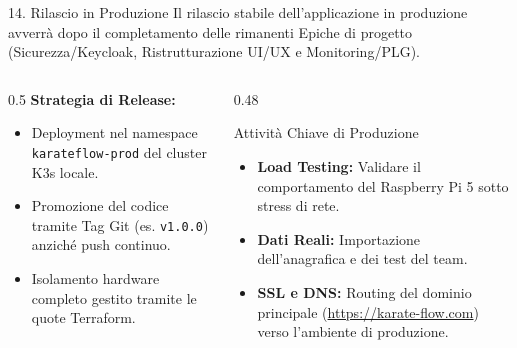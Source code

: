 \documentclass[aspectratio=169, 10pt]{beamer}
\begin{document}
\begin{frame}{14. Rilascio in Produzione}
  Il rilascio stabile dell'applicazione in produzione avverrà dopo il completamento delle rimanenti Epiche di progetto (Sicurezza/Keycloak, Ristrutturazione UI/UX e Monitoring/PLG).  
  \vspace{0.4cm}
  \begin{columns}
    \begin{column}{0.5\textwidth}
      \textbf{Strategia di Release:}
      \begin{itemize}
        \item Deployment nel namespace \texttt{karateflow-prod} del cluster K3s locale.
        \item Promozione del codice tramite Tag Git (es. \texttt{v1.0.0}) anziché push continuo.
        \item Isolamento hardware completo gestito tramite le quote Terraform.
      \end{itemize}
    \end{column}
    \begin{column}{0.48\textwidth}
      \begin{block}{Attività Chiave di Produzione}
        \begin{itemize}
          \item \textbf{Load Testing:} Validare il comportamento del Raspberry Pi 5 sotto stress di rete.
          \item \textbf{Dati Reali:} Importazione dell'anagrafica e dei test del team.
          \item \textbf{SSL e DNS:} Routing del dominio principale (\url{https://karate-flow.com}) verso l'ambiente di produzione.
        \end{itemize}
      \end{block}
    \end{column}
  \end{columns}
\end{frame}
\end{document}
